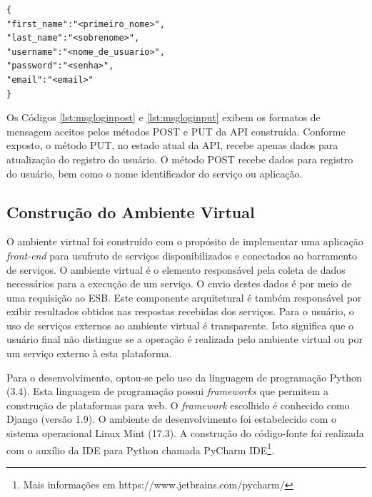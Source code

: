 
\begin{lstlisting}[caption={Formato de mensagem recebido pelo serviço de gerenciamento de usuários (método PUT).},label={lst:msgloginput}]
{
"first_name":"<primeiro_nome>",
"last_name":"<sobrenome>",
"username":"<nome_de_usuario>",
"password":"<senha>",
"email":"<email>"
}
\end{lstlisting}

Os Códigos \ref{lst:msgloginpost} e \ref{lst:msgloginput} exibem os formatos de mensagem aceitos pelos métodos POST e PUT da API construída. Conforme exposto, o método PUT, no estado atual da API, recebe apenas dados para atualização do registro do usuário. O método POST recebe dados para registro do usuário, bem como o nome identificador do serviço ou aplicação.

\subsection{Construção do Ambiente Virtual}
O ambiente virtual foi construído com o propósito de implementar uma aplicação \textit{front-end} para usufruto de serviços disponibilizados e conectados ao barramento de serviços. O ambiente virtual é o elemento responsável pela coleta de dados necessários para a execução de um serviço. O envio destes dados é por meio de uma requisição ao ESB. Este componente arquitetural é também responsável por exibir resultados obtidos nas respostas recebidas dos serviços. Para o usuário, o uso de serviços externos ao ambiente virtual é transparente. Isto significa que o usuário final não distingue se a operação é realizada pelo ambiente virtual ou por um serviço externo à esta plataforma.

Para o desenvolvimento, optou-se pelo uso da linguagem de programação Python (3.4). Esta linguagem de programação possui \textit{frameworks} que permitem a construção de plataformas para web. O \textit{framework} escolhido é conhecido como Django (versão 1.9). O ambiente de desenvolvimento foi estabelecido com o sistema operacional Linux Mint (17.3). A construção do código-fonte foi realizada com o auxílio da IDE para Python chamada PyCharm IDE\footnote{Mais informações em https://www.jetbrains.com/pycharm/}.

